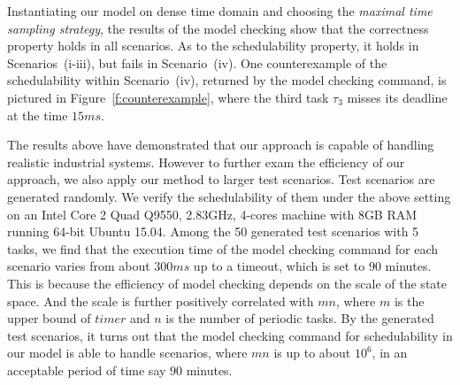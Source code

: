 \documentclass[10pt,journal]{IEEEtran}
\newcommand{\hide}[1]{\ignorespaces}
\begin{document}
{Instantiating our model on dense time domain and choosing the
\emph{maximal time sampling strategy}, the results of the model
checking show that the correctness property holds in all scenarios. As
to the schedulability property, it holds in Scenarios~(i-iii), but
fails in Scenario~(iv).  One counterexample of the schedulability
within Scenario~(iv), returned by the model checking command, is
pictured in Figure~\ref{f:counterexample}, where the third task
$\tau_3$ misses its deadline at the time $15ms$.

The results above have demonstrated that our approach is capable of
handling realistic industrial systems. However to further exam the
efficiency of our approach, we also apply our method to larger test
scenarios. Test scenarios are generated randomly. We verify the
schedulability of them under the above setting on an Intel Core 2 Quad
Q9550, 2.83GHz, 4-cores machine with 8GB RAM running 64-bit Ubuntu
15.04. Among the 50 generated test scenarios with 5 tasks, we find
that the execution time of the model checking command for each
scenario varies from about $300ms$ up to a timeout, which is set to
$90$ minutes. This is because the efficiency of model checking depends
on the scale of the state space. And the scale is further positively
correlated with $mn$, where $m$ is the upper bound of $timer$ and $n$
is the number of periodic tasks. By the generated test scenarios, it
turns out that the model checking command for schedulability in our
model is able to handle scenarios, where $mn$ is up to about $10^6$,
in an acceptable period of time say $90$ minutes.


\hide{
\begin{figure*}[!t]
\centering
\begin{picture}(300,120)(0,-10)
\thicklines
\put(0,0){\vector(1,0){320}}
\put(305,5){time(${\mu}s$)}
\thinlines
\put(0,0){\line(0,1){110}}
\put(-25,97){task$0$}
\put(-25,77){task$1$}
\put(-25,57){task$2$}
\put(-50,37){scheduling}
\put(-45,17){switching}
\put(-2,-8){$0$}

\dashline[30]{3}(0,100)(250,100)
\dashline[30]{3}(0,80)(280,80)
\dashline[30]{3}(0,60)(300,60)
\dashline[30]{3}(0,40)(210,40)
\dashline[30]{3}(0,20)(285,20)


\dashline[30]{3}(10,-10)(10,100)
\thicklines
\textcolor{red}{\put(0,40){\line(1,0){10}}}
\put(8,-18){$9$}

\thinlines
\dashline[30]{3}(50,0)(50,100)
\thicklines
\textcolor{blue}{\put(10,100){\line(1,0){40}}}
\put(35,-8){$2509$}

\thinlines
\dashline[30]{3}(55,-10)(55,80)
\thicklines
\textcolor{red}{\put(50,20){\line(1,0){5}}}
\put(46,-18){$2513$}


\end{picture}
\end{figure*}}}
\end{document}
